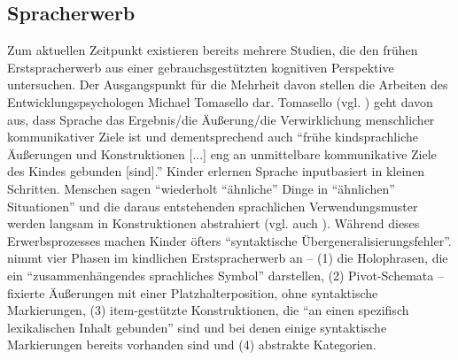 


\subsection{Spracherwerb}
Zum aktuellen Zeitpunkt existieren bereits mehrere Studien, die den frühen Erstspracherwerb aus einer gebrauchsgestützten kognitiven Perspektive untersuchen.
Der Ausgangspunkt für die Mehrheit davon stellen die Arbeiten des Entwicklungspsychologen Michael Tomasello dar.
Tomasello (vgl. \cite{Tomasello06}) geht davon aus, dass Sprache das Ergebnis/die Äußerung/die Verwirklichung menschlicher kommunikativer Ziele ist
und dementsprechend auch ``frühe kindsprachliche Äußerungen und Konstruktionen [...] eng an unmittelbare kommunikative Ziele des Kindes gebunden [sind].''
Kinder erlernen Sprache inputbasiert in kleinen Schritten.
Menschen sagen ``wiederholt ``ähnliche'' Dinge in ``ähnlichen'' Situationen'' \cite{Tomasello06} und die daraus entstehenden sprachlichen Verwendungsmuster werden langsam in Konstruktionen abstrahiert (vgl. auch \cite{Ellis08}).
Während dieses Erwerbsprozesses machen Kinder öfters ``syntaktische Übergeneralisierungsfehler''.%
\cite{Tomasello06} nimmt vier Phasen im kindlichen Erstspracherwerb an --
(1) die Holophrasen, die ein ``zusammenhängendes sprachliches Symbol'' darstellen,
(2) Pivot-Schemata -- fixierte Äußerungen mit einer Platzhalterposition, ohne syntaktische Markierungen,
(3) item-gestützte Konstruktionen, die ``an einen spezifisch lexikalischen Inhalt gebunden'' sind und bei denen einige syntaktische Markierungen bereits vorhanden sind
und (4) abstrakte Kategorien.




